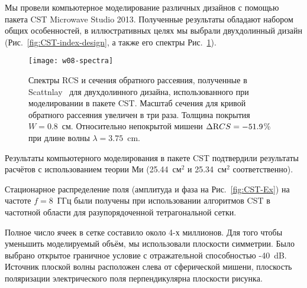 Мы провели компьютерное моделирование различных дизайнов с помощью
пакета CST Microwave Studio 2013.  Полученные результаты обладают
набором общих особенностей, в иллюстративных целях мы выбрали
двухдолинный дизайн (Рис.~\ref{fig:CST-index-design}, а также его спектры Рис.~\ref{fig:CST-design-spectra}).
\begin{figure}
  \texttt{[image: w08-spectra]}%
  \caption{Спектры RCS и сечения обратного рассеяния, полученные в
    Scattnlay~\cite{pena_scattering_2009} для двухдолинного дизайна,
    использованного при моделировании в пакете CST. Масштаб сечения
    для кривой обратного рассеяния увеличен в три раза.  Толщина
    покрытия $W=0.8$~см. Относительно непокрытой мишени $\Delta {\textrm
      RCS}=-51.9$\% при длине волны $\lambda=3.75$~cm.     %
    \label{fig:CST-design-spectra}}%
\end{figure}
Результаты компьютерного моделирования в пакете CST подтвердили
результаты расчётов с использованием теории Ми (25.44~см$^2$ и
25.34~см$^2$ соответственно).

Стационарное распределение поля (амплитуда  и фаза на
Рис.~\ref{fig:CST-Ex}) на частоте ${f = 8}$~ГГц были получены при
использовании алгоритмов CST в частотной области для разупорядоченной
тетрагональной сетки.
\begin{figure}
\end{figure}
Полное число ячеек в сетке составило около 4-х миллионов.  Для того
чтобы уменьшить моделируемый объём, мы использовали плоскости
симметрии.  Было выбрано открытое граничное условие с отражательной
способностью -40~dB.  Источник плоской волны расположен слева от
сферической мишени, плоскость поляризации электрического поля
перпендикулярна плоскости рисунка.

